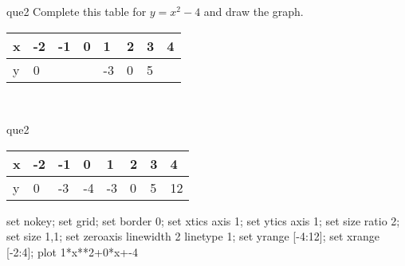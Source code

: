 \documentclass[13.5pt, varwidth=true]{beamer}
\begin{document}
\begin{frame}[shrink=19,fragile]
	\begin{beamercolorbox}[rounded=true, left, shadow=true,wd=14.8cm]{que2}
		 Complete this table for $y = x^{2} - 4$ and draw the graph. \\[0.3cm] \renewcommand{\arraystretch}{1.2}\begin{tabular}{|C|C|C|C|C|C|C|C|} \hline x & -2 & -1 & 0 & 1 & 2 & 3 & 4 \\ \hline y & 0 &  &  & -3 & 0 & 5 & \\ \hline \end{tabular}\\[0.3cm]
	\end{beamercolorbox}
\end{frame}
\begin{frame}[shrink=19,fragile]
	\begin{beamercolorbox}[rounded=true, left, shadow=true,wd=14.8cm]{que2}
		\renewcommand{\arraystretch}{1.2}\begin{tabular}{|C|C|C|C|C|C|C|C|} \hline x & -2 & -1 & 0 & 1 & 2 & 3 & 4 \\ \hline y & 0 & -3 & -4 & -3 & 0 & 5 & 12\\ \hline \end{tabular}\begin{gnuplot}[terminal=pdf] set nokey; set grid; set border 0; set xtics axis 1; set ytics axis 1; set size ratio 2; set size 1,1; set zeroaxis linewidth 2 linetype 1; set yrange [-4:12]; set xrange [-2:4]; plot 1*x**2+0*x+-4 \end{gnuplot}
	\end{beamercolorbox}
\end{frame}
\end{document}
